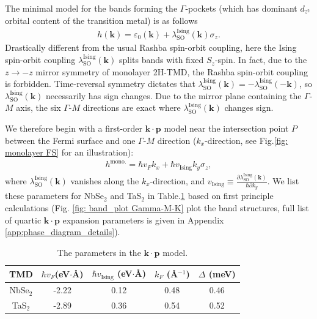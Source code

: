 The minimal model for the bands forming the $\Gamma$-pockets (which has dominant $d_{z^2}$ orbital content of the transition metal) is as follows
\begin{align}
	h(\bm k)=\varepsilon_0(\bm k)+\lambda^{\text{Ising}}_{\mathrm{SO}}(\bm k) \sigma_z.
\end{align}
Drastically different from the usual Rashba spin-orbit coupling, here the Ising spin-orbit coupling $\lambda^{\text{Ising}}_{\mathrm{SO}}(\bm k)$ splits bands with fixed $S_z$-spin. In fact, due to the $z\rightarrow -z$ mirror symmetry of monolayer 2H-TMD, the Rashba spin-orbit coupling is forbidden. Time-reversal symmetry dictates that $\lambda^{\text{Ising}}_{\mathrm{SO}}(\bm k)=-\lambda^{\text{Ising}}_{\mathrm{SO}}(-\bm k)$, so $\lambda^{\text{Ising}}_{\mathrm{SO}}(\bm k)$ necessarily has sign changes. Due to the mirror plane containing the $\Gamma$-$M$ axis, the six $\Gamma$-$M$ directions are exact where $\lambda^{\text{Ising}}_{\mathrm{SO}}(\bm k)$ changes sign.

We therefore begin with a first-order $\bm{k\cdot p}$ model near the intersection point $P$ between the Fermi surface and one $\Gamma$-$M$ direction ($k_x$-direction, see Fig.\ref{fig: monolayer FS} for an illustration):
\begin{align}
	h^{\text{mono.}}=\hbar v_F k_x + \hbar v_{\text{Ising}} k_y\sigma_z,\label{eqn:1layer}
\end{align}
where $\lambda^{\text{Ising}}_{\mathrm{SO}}(\bm k)$ vanishes along the $k_x$-direction, and $v_{\text{Ising}}\equiv \frac{\partial \lambda^{\text{Ising}}_{\mathrm{SO}}(\bm k)}{\hbar \partial k_y}$. We list these parameters for NbSe$_2$ and TaS$_2$ in Table.\ref{table:parameters} based on first principle calculations (Fig. \ref{fig: band_plot Gamma-M-K} plot the band structures, full list of quartic $\bm{k\cdot p}$ expansion parameters is given in Appendix \ref{app:phase_diagram_details}).
\begin{table}
	\centering
	\begin{tabular}{|c|c|c|c|c|}
		\hline
		TMD      & $\hbar v_F$(eV$\cdot$\AA) & $\hbar v_{\text{Ising}}$ (eV$\cdot$\AA) & $k_F$ (\AA$^{-1}$) & $\Delta$ (meV) \\ \hline
		NbSe$_2$ & -2.22                     & 0.12                                    & 0.48               & 0.46           \\ \hline
		TaS$_2$  & -2.89                     & 0.36                                    & 0.54               & 0.52           \\ \hline
	\end{tabular}
	\caption{The parameters in the $\bm{k\cdot p}$ model.}
	\label{table:parameters}
\end{table}

